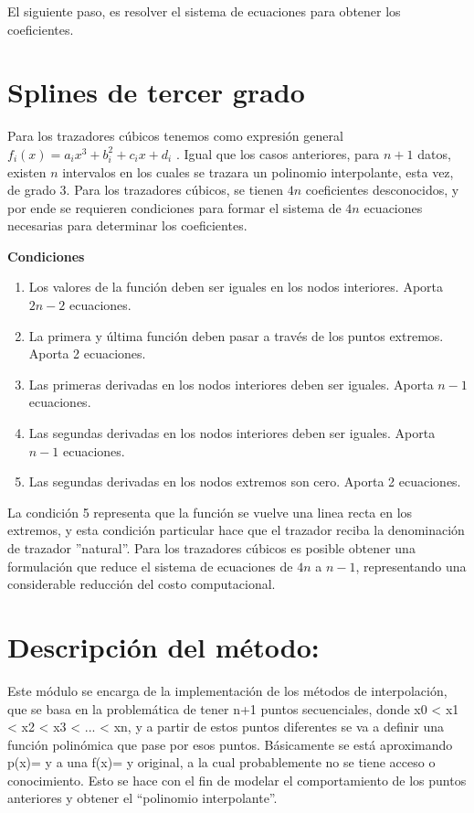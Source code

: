 \documentclass[letterpaper,10pt,oneside]{sphinxmanual}
\theoremstyle{plain}%
\theoremstyle{definition}%
\theoremstyle{remark}%
\begin{document}
El siguiente paso, es resolver el sistema de ecuaciones para obtener los coeficientes.

\section{Splines de tercer grado}

Para los trazadores cúbicos tenemos como expresión general $f_i(x) = a_ix^
3 +
b^
2_
i + c_ix + d_i$
. Igual que los casos anteriores, para $n + 1$ datos, existen $n$ intervalos
en los cuales se trazara un polinomio interpolante, esta vez, de grado $3$. Para los
trazadores cúbicos, se tienen $4n$ coeficientes desconocidos, y por ende se requieren
condiciones para formar el sistema de $4n$ ecuaciones necesarias para determinar
los coeficientes.

\textbf{Condiciones}

\begin{enumerate}
	\item Los valores de la función deben ser iguales en los nodos interiores. Aporta $2n-2$ ecuaciones.
	\item La primera y última función deben pasar a través de los puntos extremos. Aporta 2 ecuaciones.
	\item Las primeras derivadas en los nodos interiores deben ser iguales. Aporta $n-1$ecuaciones.
	\item Las segundas derivadas en los nodos interiores deben ser iguales. Aporta $n-1$ ecuaciones.
	\item Las segundas derivadas en los nodos extremos son cero. Aporta 2 ecuaciones.
\end{enumerate}

La condición 5 representa que la función se vuelve una linea recta en los extremos,
y esta condición particular hace que el trazador reciba la denominación de trazador
”natural”. Para los trazadores cúbicos es posible obtener una formulación que reduce el
sistema de ecuaciones de $4n$ a $n-1$, representando una considerable reducción
del costo computacional.

\section{Descripción del método:}
\label{chapter02:descripcion-del-metodo}
Este módulo se encarga de la implementación de los métodos de interpolación, que se basa en la problemática de tener n+1 puntos secuenciales,
donde x0 \textless{} x1 \textless{} x2 \textless{} x3 \textless{} ... \textless{} xn, y a partir de estos puntos diferentes se va a definir una función polinómica que pase por esos puntos.
Básicamente se está aproximando p(x)= y a una f(x)= y original, a la cual probablemente no se tiene acceso o conocimiento. Esto se hace con el fin
de modelar el comportamiento de los puntos anteriores y obtener el ``polinomio interpolante''.
\end{document}
